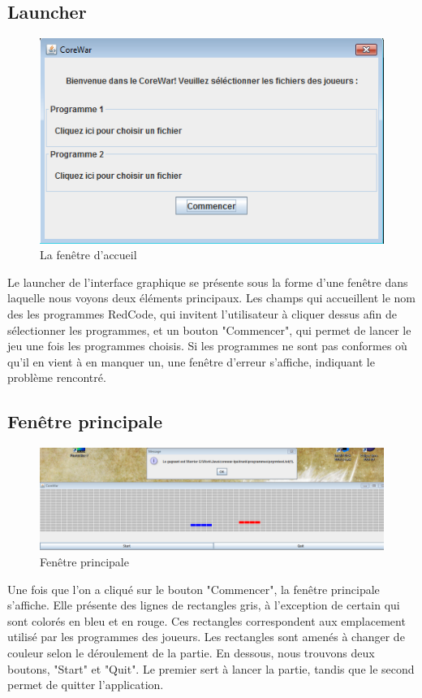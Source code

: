 \documentclass[hidelinks]{report}
\begin{document}
\subsection{Launcher}
\begin{figure}[H]
    \centering
    \includegraphics[scale=0.7]{images/visuelauncher.png}
    \caption{La fenêtre d'accueil}
    \label{fig:visulauncher}
\end{figure}
Le launcher de l'interface graphique se présente sous la forme d'une fenêtre dans laquelle nous voyons deux éléments principaux. Les champs qui accueillent le nom des les programmes RedCode, qui invitent l'utilisateur à cliquer dessus afin de sélectionner les programmes, et un bouton "Commencer", qui permet de lancer le jeu une fois les programmes choisis. Si les programmes ne sont pas conformes où qu'il en vient à en manquer un, une fenêtre d'erreur s'affiche, indiquant le problème rencontré.
\subsection{Fenêtre principale}
\begin{figure}
    \centering
    \includegraphics[scale=0.7]{images/visuelinterface2.png}
    \caption{Fenêtre principale}
    \label{fig:visuprincipale}
\end{figure}
Une fois que l'on a cliqué sur le bouton "Commencer", la fenêtre principale s'affiche. Elle présente des lignes de rectangles gris, à l'exception de certain qui sont colorés en bleu et en rouge. Ces rectangles correspondent aux emplacement utilisé par les programmes des joueurs. Les rectangles sont amenés à changer de couleur selon le déroulement de la partie. En dessous, nous trouvons deux boutons, "Start" et "Quit". Le premier sert à lancer la partie, tandis que le second permet de quitter l'application.
\end{document}
